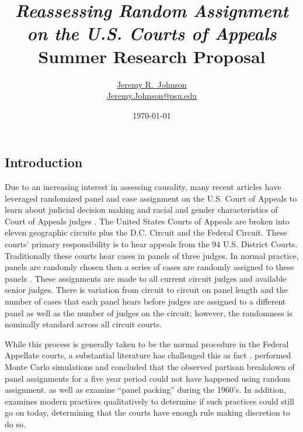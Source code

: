 \documentclass[12pt]{article}
\title{\textit{Reassessing Random Assignment on the U.S. Courts of Appeals}\\ \vspace{5mm}Summer Research Proposal}
\author{\href{http://www.jeremyrjohnson.org/}{Jeremy R.\ Johnson}\\ \href{mailto:Jeremy.Johnson@psu.edu}{Jeremy.Johnson@psu.edu}}
\affil{Pennsylvania State University}
\date{\today}
\begin{document}
\maketitle
\thispagestyle{empty}
\pagebreak

\singlespacing
\setcounter{page}{1}

\subsection*{Introduction}
Due to an increasing interest in assessing causality, many recent articles have leveraged randomized panel and case assignment on the U.S. Court of Appeals to learn about judicial decision making and racial and gender characteristics of Court of Appeals judges \citep{Kastellec2010,Glynn2015,Farhang2014}.  The United States Courts of Appeals are broken into eleven geographic circuits plus the D.C. Circuit and the Federal Circuit.  These courts' primary responsibility is to hear appeals from the 94 U.S. District Courts.  Traditionally these courts hear cases in panels of three judges.  In normal practice, panels are randomly chosen then a series of cases are randomly assigned to these panels \citep{Hooper2011, Journalist2011,Chilton2014,Songer2007}.%
These assignments are made to all current circuit judges and available senior judges.  There is variation from circuit to circuit on panel length and the number of cases that each panel hears before judges are assigned to a different panel as well as the number of judges on the circuit; however, the randomness is nominally standard across all circuit courts.  

While this process is generally taken to be the normal procedure in the Federal Appellate courts, a substantial literature has challenged this as fact \citep{Atkins1974,Brown2000,Chilton2014}.  \citet{Chilton2014} performed Monte Carlo simulations and concluded that the observed partisan breakdown of panel assignments for a five year period could not have happened using random assignment.  \citet{Atkins1974} as well as \citet{Brown2000} examine ``panel packing'' during the 1960's.  In addition, \citet{Brown2000} examines modern practices qualitatively to determine if such practices could still go on today, determining that the courts have enough rule making discretion to do so.
\end{document}
